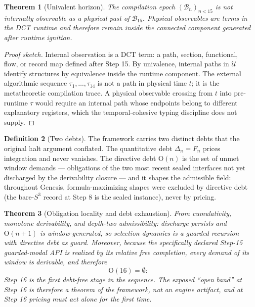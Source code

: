 \documentclass[11pt]{article}
\theoremstyle{plain}
\newtheorem{theorem}{Theorem}[section]
\theoremstyle{definition}
\newtheorem{definition}[theorem]{Definition}
\theoremstyle{remark}
\newenvironment{proofsketch}{\begin{proof}[Proof sketch]}{\end{proof}}
\newcommand{\B}{\mathcal{B}}
\newcommand{\U}{\mathcal{U}}
\begin{document}
\begin{theorem}[Univalent horizon]
The compilation epoch \((\B_n)_{n<15}\) is not internally observable as a physical past of \(\B_{15}\). Physical observables are terms in the DCT runtime and therefore remain inside the connected component generated after runtime ignition.
\end{theorem}

\begin{proofsketch}
Internal observation is a DCT term: a path, section, functional, flow, or record map defined after Step 15. By univalence, internal paths in \(\U\) identify structures by equivalence inside the runtime component. The external algorithmic sequence \(\tau_1,\ldots,\tau_{14}\) is not a path in physical time \(t\); it is the metatheoretic compilation trace. A physical observable crossing from \(t\) into pre-runtime \(\tau\) would require an internal path whose endpoints belong to different explanatory registers, which the temporal-cohesive typing discipline does not supply.
\end{proofsketch}

\begin{definition}[Two debts]
The framework carries two distinct debts that the original halt argument conflated. The quantitative debt \(\Delta_n=F_n\) prices integration and never vanishes. The directive debt \(\mathrm{O}(n)\) is the set of unmet window demands --- obligations of the two most recent sealed interfaces not yet discharged by the derivability closure --- and it shapes the admissible field: throughout Genesis, formula-maximizing shapes were excluded by directive debt (the bare-\(S^3\) record at Step 8 is the sealed instance), never by pricing.
\end{definition}

\begin{theorem}[Obligation locality and debt exhaustion]
From cumulativity, monotone derivability, and depth-two admissibility: discharge persists and \(\mathrm{O}(n+1)\) is window-generated, so selection dynamics is a guarded recursion with directive debt as guard. Moreover, because the specifically declared Step-15 guarded-modal API is realized by its relative free completion, every demand of its window is derivable, and therefore
\[
\mathrm{O}(16)=\emptyset:
\]
Step 16 is the first debt-free stage in the sequence. The exposed ``open band'' at Step 16 is therefore a theorem of the framework, not an engine artifact, and at Step 16 pricing must act alone for the first time.
\end{theorem}
\end{document}
